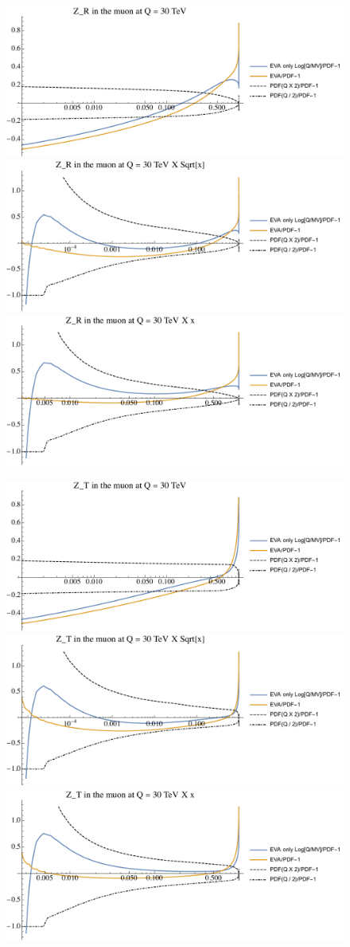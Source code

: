 \documentclass[a4paper,11pt]{article}
\begin{document}
\begin{figure}[ht]
\includegraphics[width=0.46\linewidth]{PlotPDFs/ratios/30TeV/Z_R_Q.pdf}
\includegraphics[width=0.46\linewidth]{PlotPDFs/ratios/30TeV/Z_R_Qsqrtx.pdf}
\includegraphics[width=0.46\linewidth]{PlotPDFs/ratios/30TeV/Z_R_Qx.pdf}
\end{figure}

\begin{figure}[ht]
\includegraphics[width=0.46\linewidth]{PlotPDFs/ratios/30TeV/Z_T_Q.pdf}
\includegraphics[width=0.46\linewidth]{PlotPDFs/ratios/30TeV/Z_T_Qsqrtx.pdf}
\includegraphics[width=0.46\linewidth]{PlotPDFs/ratios/30TeV/Z_T_Qx.pdf}
\end{figure}
\end{document}
